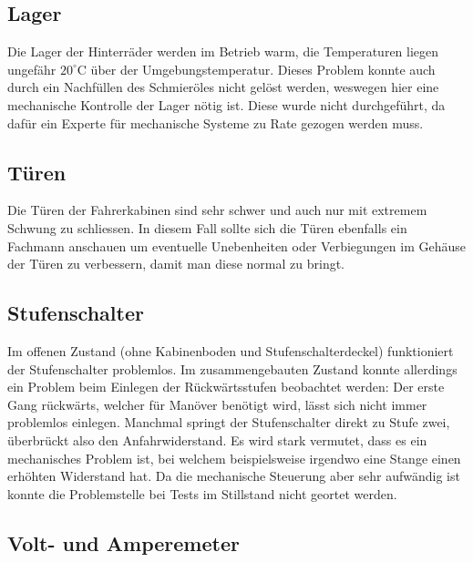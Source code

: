 \subsection{Lager}
Die Lager der Hinterräder werden im Betrieb warm, die Temperaturen liegen ungefähr $20^\circ$C über der Umgebungstemperatur. Dieses Problem konnte auch durch ein Nachfüllen des Schmieröles nicht gelöst werden, weswegen hier eine mechanische Kontrolle der Lager nötig ist. Diese wurde nicht durchgeführt, da dafür ein Experte für mechanische Systeme zu Rate gezogen werden muss.

\subsection{Türen}
Die Türen der Fahrerkabinen sind sehr schwer und auch nur mit extremem Schwung zu schliessen. In diesem Fall sollte sich die Türen ebenfalls ein Fachmann anschauen um eventuelle Unebenheiten oder Verbiegungen im Gehäuse der Türen zu verbessern, damit man diese normal zu bringt.

\subsection{Stufenschalter}
Im offenen Zustand (ohne Kabinenboden und Stufenschalterdeckel) funktioniert der Stufenschalter problemlos. Im zusammengebauten Zustand konnte allerdings ein Problem beim Einlegen der Rückwärtsstufen beobachtet werden: Der erste Gang rückwärts, welcher für Manöver benötigt wird, lässt sich nicht immer problemlos einlegen. Manchmal springt der Stufenschalter direkt zu Stufe zwei, überbrückt also den Anfahrwiderstand. Es wird stark vermutet, dass es ein mechanisches Problem ist, bei welchem beispielsweise irgendwo eine Stange einen erhöhten Widerstand hat. Da die mechanische Steuerung aber sehr aufwändig ist konnte die Problemstelle bei Tests im Stillstand nicht geortet werden.

\subsection{Volt- und Amperemeter}

\color{black}